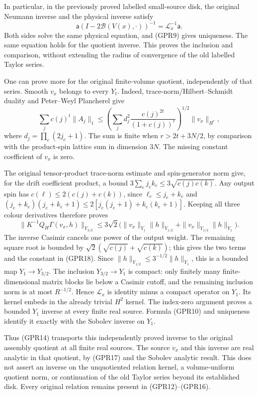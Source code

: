 \documentclass[11pt]{article}
\begin{document}
In particular, in the previously proved labelled small-source disk, the original Neumann inverse and the physical inverse satisfy
\[
 \mathsf a(I-2\mathcal B(V(x),\cdot))^{-1}
 =\mathscr L_x^{-1}\mathsf a.
 \tag{GPR16}
\]
Both sides solve the same physical equation, and (GPR9) gives uniqueness. The same equation holds for the quotient inverse. This proves the inclusion and comparison, without extending the radius of convergence of the old labelled Taylor series.

One can prove more for the original finite-volume quotient, independently of that series. Smooth \(v_x\) belongs to every \(Y_t\). Indeed, trace-norm/Hilbert–Schmidt duality and Peter–Weyl Plancherel give
\[
 \sum_jc(j)^t\|A_j\|_1
 \le\left(\sum_j d_j^2\frac{c(j)^{2t}}{(1+c(j))^r}\right)^{1/2}\|v_x\|_{H^r},
 \tag{GPR17}
\]
where \(d_j=\prod_e(2j_e+1)\). The sum is finite when \(r>2t+3N/2\), by comparison with the product-spin lattice sum in dimension \(3N\). The missing constant coefficient of \(v_x\) is zero.

The original tensor-product trace-norm estimate and spin-generator norm give, for the drift coefficient product, a bound \(3\sum_e j_ek_e\le3\sqrt{c(j)c(k)}\). Any output spin has \(c(\ell)\le2(c(j)+c(k))\), since \(\ell_e\le j_e+k_e\) and \((j_e+k_e)(j_e+k_e+1)\le2[j_e(j_e+1)+k_e(k_e+1)]\). Keeping all three colour derivatives therefore proves
\[
 \|K^{-1}Q_H\Gamma(v_x,h)\|_{Y_{3/2}}
 \le3\sqrt2\big(\|v_x\|_{Y_1}\|h\|_{Y_{1/2}}
                  +\|v_x\|_{Y_{1/2}}\|h\|_{Y_1}\big).
 \tag{GPR18}
\]
The inverse Casimir cancels one power of the output weight. The remaining square root is bounded by \(\sqrt2(\sqrt{c(j)}+\sqrt{c(k)})\); this gives the two terms and the constant in (GPR18). Since \(\|h\|_{Y_{1/2}}\le3^{-1/2}\|h\|_{Y_1}\), this is a bounded map \(Y_1\to Y_{3/2}\). The inclusion \(Y_{3/2}\to Y_1\) is compact: only finitely many finite-dimensional matrix blocks lie below a Casimir cutoff, and the remaining inclusion norm is at most \(R^{-1/2}\). Hence \(\mathscr L_x\) is identity minus a compact operator on \(Y_1\). Its kernel embeds in the already trivial \(H^2\) kernel. The index-zero argument proves a bounded \(Y_1\) inverse at every finite real source. Formula (GPR10) and uniqueness identify it exactly with the Sobolev inverse on \(Y_1\).

Thus (GPR14) transports this independently proved inverse to the original assembly quotient at all finite real sources. The source \(v_x\) and this inverse are real analytic in that quotient, by (GPR17) and the Sobolev analytic result. This does not assert an inverse on the unquotiented relation kernel, a volume-uniform quotient norm, or continuation of the old Taylor series beyond its established disk. Every original relation remains present in (GPR12)–(GPR16).
\end{document}
